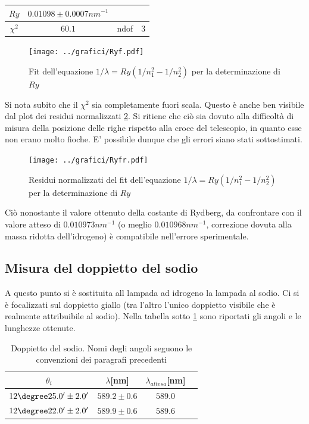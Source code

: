 \documentclass[a4paper,10pt]{article}
\begin{document}
{{{{{{{\begin{table}[H]
	\centering
	\begin{tabular}{|c|c|c|c|}
		\cline{0-1}
		$Ry$ & $0.01098 \pm 0.0007 nm^{-1}$ \\
		\hline
		$\chi^2$ & $60.1$ & ndof & 3 \\
		\hline
	\end{tabular}
\end{table}

 

\begin{figure}[H]
	\centering
	\texttt{[image: ../grafici/Ryf.pdf]}
	\caption{Fit dell'equazione $1/\lambda=Ry(1/n_1^2-1/n_2^2)$ per la determinazione di $Ry$}
	\label{fig:Idrogeno, serie Balmer}
\end{figure}

Si nota subito che il $\chi^2$ sia completamente fuori scala. Questo è anche ben visibile dal plot dei residui normalizzati \ref{fig:Idrogeno, Residui normalizzati}. Si ritiene che ciò sia dovuto alla difficoltà di misura della posizione delle righe rispetto alla croce del telescopio, in quanto esse non erano molto fioche. E' possibile dunque che gli errori siano stati sottostimati.

\begin{figure}[H]
	\centering
	\texttt{[image: ../grafici/Ryfr.pdf]}
	\caption{Residui normalizzati del fit dell'equazione $1/\lambda=Ry(1/n_1^2-1/n_2^2)$ per la determinazione di $Ry$}
	\label{fig:Idrogeno, Residui normalizzati}
\end{figure}


Ciò nonostante il valore ottenuto della costante di Rydberg, da confrontare con il valore atteso di $0.010973 nm^{-1}$ (o meglio $0.010968 nm^{-1}$, correzione dovuta alla massa ridotta dell'idrogeno) è compatibile nell'errore sperimentale.
 

\subsection{Misura del doppietto del sodio}
A questo punto si è sostituita all lampada ad idrogeno la lampada al sodio. Ci si è focalizzati sul doppietto giallo (tra l'altro l'unico doppietto visibile che è realmente attribuibile al sodio). Nella tabella sotto \ref{tab:NaR} sono riportati gli angoli e le lunghezze ottenute.

\begin{table}[H]
	\centering
	\begin{tabular}{c|c|c|c}
		$\theta_i$ & $\lambda$[nm] & $\lambda_{attesa}$[nm]  \\
		\hline
  $ 12\degree 25.0' \pm 2.0 ' $ & $ 589.2 \pm 0.6 $ & $ 589.0 $ \\
  $ 12\degree 22.0' \pm 2.0 ' $ & $ 589.9 \pm 0.6 $ & $ 589.6 $ \\
\end{tabular}
	\caption{Doppietto del sodio. Nomi degli angoli seguono le convenzioni dei paragrafi precedenti}
	\label{tab:NaR}
\end{table}

}}}}}}}
\end{document}
